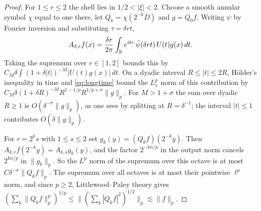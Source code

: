 \begin{proof}
For $1\le r\le2$ the shell lies in $1/2<|\xi|<2$. Choose a smooth annular symbol $\chi$ equal to one
there, let $Q_k=\chi(2^{-k}D)$ and $g=Q_0f$. Writing $\psi$ by Fourier inversion and substituting
$\tau=\delta rt$,
\[
A_{\delta,r}f(x)=\frac{\delta r}{2\pi}\int_{\mathbb{R}} e^{itr}\,\hat\psi(\delta rt)\,U(t)g(x)\,dt .
\]
Taking the supremum over $r\in[1,2]$ bounds this by $C_M\delta\int(1+\delta|t|)^{-M}|U(t)g(x)|\,dt$. On a
dyadic interval $R\le|t|\le2R$, H\"older's inequality in time and \eqref{eq:longtime} bound the $L^p_x$
norm of this contribution by $C_M\delta(1+\delta R)^{-M}R^{1-1/p}R^{1/p+\sigma}\|g\|_p$. For $M>1+\sigma$ the
sum over dyadic $R\ge1$ is $O(\delta^{-\sigma}\|g\|_p)$, as one sees by splitting at $R=\delta^{-1}$; the
interval $|t|\le1$ contributes $O(\delta\|g\|_p)$.

For $r=2^ks$ with $1\le s\le2$ set $g_k(y)=(Q_kf)(2^{-k}y)$. Then $A_{\delta,r}f(2^{-k}y)=A_{\delta,s}g_k(y)$,
and the factor $2^{-kn/p}$ in the output norm cancels $2^{kn/p}$ in $\|g_k\|_p$. So the $L^p$ norm of the
supremum over this octave is at most $C\delta^{-\sigma}\|Q_kf\|_p$. The supremum over all octaves is at
most their pointwise $\ell^p$ norm, and since $p\ge2$, Littlewood--Paley theory gives
$(\sum_k\|Q_kf\|_p^p)^{1/p}\le\|(\sum_k|Q_kf|^2)^{1/2}\|_p\lesssim\|f\|_p$.
\end{proof}

